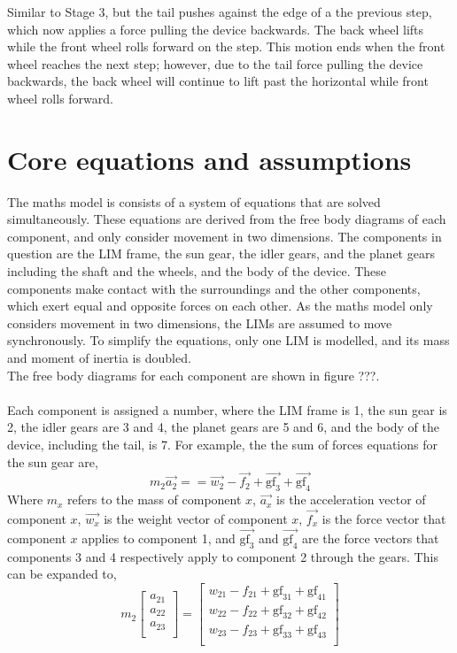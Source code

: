 Similar to Stage 3, but the tail pushes against the edge of a the previous step, which now applies a force pulling the device backwards. The back wheel lifts while the front wheel rolls forward on the step. This motion ends when the front wheel reaches the next step; however, due to the tail force pulling the device backwards, the back wheel will continue to lift past the horizontal while front wheel rolls forward.\\


\section{Core equations and assumptions}

The maths model is consists of a system of equations that are solved simultaneously. These equations are derived from the free body diagrams of each component, and only consider movement in two dimensions. The components in question are the LIM frame, the sun gear, the idler gears, and the planet gears including the shaft and the wheels, and the body of the device. These components make contact with the surroundings and the other components, which exert equal and opposite forces on each other. As the maths model only considers movement in two dimensions, the LIMs are assumed to move synchronously. To simplify the equations, only one LIM is modelled, and its mass and moment of inertia is doubled.\\
The free body diagrams for each component are shown in figure ???.\\
\\
Each component is assigned a number, where the LIM frame is 1, the sun gear is 2, the idler gears are 3 and 4, the planet gears are 5 and 6, and the body of the device, including the tail, is 7.
For example, the the sum of forces equations for the sun gear are,\\
\begin{equation}
	m_2\vec{a_2} == \vec{w_2}-\vec{f_2}+\vec{\mathrm{gf}_3}+\vec{\mathrm{gf}_4}
\end{equation}
Where $m_x$ refers to the mass of component $x$, $\vec{a_x}$ is the acceleration vector of component $x$, $\vec{w_x}$ is the weight vector of component $x$, $\vec{f_x}$ is the force vector that component $x$ applies to component 1,  and $\vec{\mathrm{gf}_3}$ and $\vec{\mathrm{gf}_4}$ are the force vectors that components 3 and 4 respectively apply to component 2 through the gears.
This can be expanded to,
\begin{equation}
	m_2
	\begin{bmatrix}
		a_{21}\\
		a_{22}\\
		a_{23}\\
	\end{bmatrix}
	=
	\begin{bmatrix}
		w_{21}-f_{21}+\mathrm{gf}_{31}+\mathrm{gf}_{41}\\
		w_{22}-f_{22}+\mathrm{gf}_{32}+\mathrm{gf}_{42}\\
		w_{23}-f_{23}+\mathrm{gf}_{33}+\mathrm{gf}_{43}\\
	\end{bmatrix}
\end{equation}
